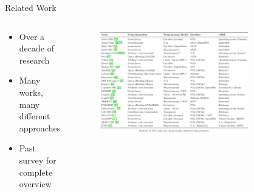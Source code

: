 \documentclass[aspectratio=169, notes]{beamer}
\begin{document}
\begin{frame}{Related Work}
    \begin{columns}
        \begin{column}{0.25\textwidth}
            \footnotesize
            \begin{itemize}
                \item Over a decade of research
                \item Many works, many different approaches
                \item Past survey for complete overview \footnotemark[5]
            \end{itemize}
        \end{column}
        \begin{column}{0.75\textwidth}
            \begingroup
            \begin{figure}
                \centering
                \includegraphics[width=0.8\textwidth]{resources/images/related-work.png}
            \end{figure}
            \endgroup
        \end{column}
    \end{columns}
\end{frame}
\end{document}
